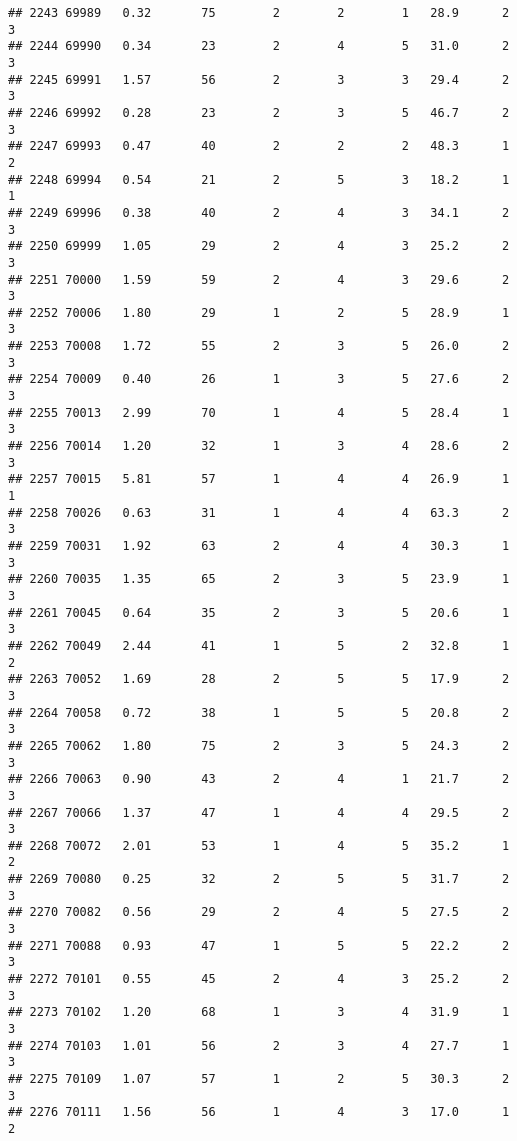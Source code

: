 \documentclass[
]{article}
\begin{document}
\begin{verbatim}
## 2243 69989   0.32       75        2        2        1   28.9      2      3
## 2244 69990   0.34       23        2        4        5   31.0      2      3
## 2245 69991   1.57       56        2        3        3   29.4      2      3
## 2246 69992   0.28       23        2        3        5   46.7      2      3
## 2247 69993   0.47       40        2        2        2   48.3      1      2
## 2248 69994   0.54       21        2        5        3   18.2      1      1
## 2249 69996   0.38       40        2        4        3   34.1      2      3
## 2250 69999   1.05       29        2        4        3   25.2      2      3
## 2251 70000   1.59       59        2        4        3   29.6      2      3
## 2252 70006   1.80       29        1        2        5   28.9      1      3
## 2253 70008   1.72       55        2        3        5   26.0      2      3
## 2254 70009   0.40       26        1        3        5   27.6      2      3
## 2255 70013   2.99       70        1        4        5   28.4      1      3
## 2256 70014   1.20       32        1        3        4   28.6      2      3
## 2257 70015   5.81       57        1        4        4   26.9      1      1
## 2258 70026   0.63       31        1        4        4   63.3      2      3
## 2259 70031   1.92       63        2        4        4   30.3      1      3
## 2260 70035   1.35       65        2        3        5   23.9      1      3
## 2261 70045   0.64       35        2        3        5   20.6      1      3
## 2262 70049   2.44       41        1        5        2   32.8      1      2
## 2263 70052   1.69       28        2        5        5   17.9      2      3
## 2264 70058   0.72       38        1        5        5   20.8      2      3
## 2265 70062   1.80       75        2        3        5   24.3      2      3
## 2266 70063   0.90       43        2        4        1   21.7      2      3
## 2267 70066   1.37       47        1        4        4   29.5      2      3
## 2268 70072   2.01       53        1        4        5   35.2      1      2
## 2269 70080   0.25       32        2        5        5   31.7      2      3
## 2270 70082   0.56       29        2        4        5   27.5      2      3
## 2271 70088   0.93       47        1        5        5   22.2      2      3
## 2272 70101   0.55       45        2        4        3   25.2      2      3
## 2273 70102   1.20       68        1        3        4   31.9      1      3
## 2274 70103   1.01       56        2        3        4   27.7      1      3
## 2275 70109   1.07       57        1        2        5   30.3      2      3
## 2276 70111   1.56       56        1        4        3   17.0      1      2

\end{verbatim}
\end{document}
